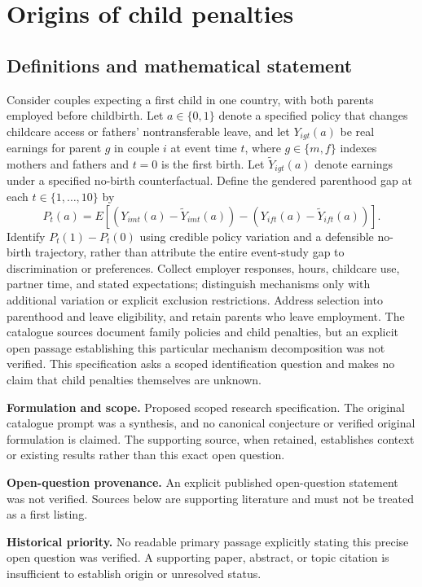 \documentclass[11pt]{article}
\begin{document}
\section*{Origins of child penalties}\label{30007739}
\subsection{Definitions and mathematical statement}
Consider couples expecting a first child in one country, with both parents employed before childbirth. Let \(a\in\{0,1\}\) denote a specified policy that changes childcare access or fathers’ nontransferable leave, and let \(Y_{igt}(a)\) be real earnings for parent \(g\) in couple \(i\) at event time \(t\), where \(g\in\{m,f\}\) indexes mothers and fathers and \(t=0\) is the first birth. Let \(\widetilde Y_{igt}(a)\) denote earnings under a specified no-birth counterfactual. Define the gendered parenthood gap at each \(t\in\{1,\ldots,10\}\) by
\[P_t(a)=E[(Y_{imt}(a)-\widetilde Y_{imt}(a))-(Y_{ift}(a)-\widetilde Y_{ift}(a))].\]
Identify \(P_t(1)-P_t(0)\) using credible policy variation and a defensible no-birth trajectory, rather than attribute the entire event-study gap to discrimination or preferences. Collect employer responses, hours, childcare use, partner time, and stated expectations; distinguish mechanisms only with additional variation or explicit exclusion restrictions. Address selection into parenthood and leave eligibility, and retain parents who leave employment. The catalogue sources document family policies and child penalties, but an explicit open passage establishing this particular mechanism decomposition was not verified. This specification asks a scoped identification question and makes no claim that child penalties themselves are unknown.

\par\textbf{Formulation and scope.} Proposed scoped research specification. The original catalogue prompt was a synthesis, and no canonical conjecture or verified original formulation is claimed. The supporting source, when retained, establishes context or existing results rather than this exact open question.

\par\textbf{Open-question provenance.} An explicit published open-question statement was not verified. Sources below are supporting literature and must not be treated as a first listing.

\par\textbf{Historical priority.} No readable primary passage explicitly stating this precise open question was verified. A supporting paper, abstract, or topic citation is insufficient to establish origin or unresolved status.
\end{document}
